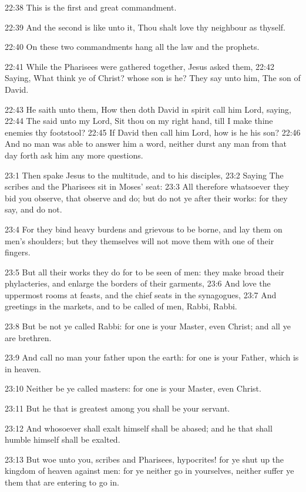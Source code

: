 22:38 This is the first and great commandment.

22:39 And the second is like unto it, Thou shalt love thy neighbour as
thyself.

22:40 On these two commandments hang all the law and the prophets.

22:41 While the Pharisees were gathered together, Jesus asked them,
22:42 Saying, What think ye of Christ? whose son is he? They say unto
him, The son of David.

22:43 He saith unto them, How then doth David in spirit call him Lord,
saying, 22:44 The \LORD said unto my Lord, Sit thou on my right hand,
till I make thine enemies thy footstool?  22:45 If David then call him
Lord, how is he his son?  22:46 And no man was able to answer him a
word, neither durst any man from that day forth ask him any more
questions.

23:1 Then spake Jesus to the multitude, and to his disciples, 23:2
Saying The scribes and the Pharisees sit in Moses' seat: 23:3 All
therefore whatsoever they bid you observe, that observe and do; but do
not ye after their works: for they say, and do not.

23:4 For they bind heavy burdens and grievous to be borne, and lay
them on men's shoulders; but they themselves will not move them with
one of their fingers.

23:5 But all their works they do for to be seen of men: they make
broad their phylacteries, and enlarge the borders of their garments,
23:6 And love the uppermost rooms at feasts, and the chief seats in
the synagogues, 23:7 And greetings in the markets, and to be called of
men, Rabbi, Rabbi.

23:8 But be not ye called Rabbi: for one is your Master, even Christ;
and all ye are brethren.

23:9 And call no man your father upon the earth: for one is your
Father, which is in heaven.

23:10 Neither be ye called masters: for one is your Master, even
Christ.

23:11 But he that is greatest among you shall be your servant.

23:12 And whosoever shall exalt himself shall be abased; and he that
shall humble himself shall be exalted.

23:13 But woe unto you, scribes and Pharisees, hypocrites! for ye shut
up the kingdom of heaven against men: for ye neither go in yourselves,
neither suffer ye them that are entering to go in.

